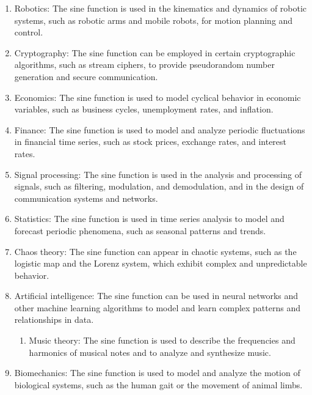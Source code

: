 \documentclass[
]{article}
\providecommand{\tightlist}{%
  \setlength{\itemsep}{0pt}\setlength{\parskip}{0pt}}
\begin{document}
\begin{enumerate}
  \begin{enumerate}
  \def\labelenumii{\arabic{enumii}.}
  \setcounter{enumii}{9}
  \tightlist
  \item
    Control theory: The sine function is used to describe the response
    of dynamic systems to sinusoidal inputs and to design feedback
    control systems that ensure stability and optimal performance.
  \end{enumerate}
\item
  Robotics: The sine function is used in the kinematics and dynamics of
  robotic systems, such as robotic arms and mobile robots, for motion
  planning and control.
\item
  Cryptography: The sine function can be employed in certain
  cryptographic algorithms, such as stream ciphers, to provide
  pseudorandom number generation and secure communication.
\item
  Economics: The sine function is used to model cyclical behavior in
  economic variables, such as business cycles, unemployment rates, and
  inflation.
\item
  Finance: The sine function is used to model and analyze periodic
  fluctuations in financial time series, such as stock prices, exchange
  rates, and interest rates.
\item
  Signal processing: The sine function is used in the analysis and
  processing of signals, such as filtering, modulation, and
  demodulation, and in the design of communication systems and networks.
\item
  Statistics: The sine function is used in time series analysis to model
  and forecast periodic phenomena, such as seasonal patterns and trends.
\item
  Chaos theory: The sine function can appear in chaotic systems, such as
  the logistic map and the Lorenz system, which exhibit complex and
  unpredictable behavior.
\item
  Artificial intelligence: The sine function can be used in neural
  networks and other machine learning algorithms to model and learn
  complex patterns and relationships in data.

  \begin{enumerate}
  \def\labelenumii{\arabic{enumii}.}
  \setcounter{enumii}{18}
  \tightlist
  \item
    Music theory: The sine function is used to describe the frequencies
    and harmonics of musical notes and to analyze and synthesize music.
  \end{enumerate}
\item
  Biomechanics: The sine function is used to model and analyze the
  motion of biological systems, such as the human gait or the movement
  of animal limbs.
\end{enumerate}
\end{document}
